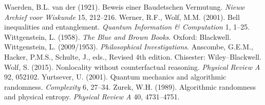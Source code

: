 \documentclass[12pt]{article}
\numberwithin{equation}{section}
\begin{document}
\begin{thebibliography}{99}
Waerden, B.L.  van der  (1921). Beweis einer Baudetschen
Vermutung. \emph{Nieuw Archief voor Wiskunde} 15, 212--216.
 \bibitem{}
 Werner, R.F., Wolf, M.M. (2001). Bell inequalities and entanglement. 
 \emph{Quantum Information \& Computation} 1, 1--25. 
 \bibitem{} Wittgenstein, L. (1958). \emph{The Blue and Brown Books}. Oxford:  Blackwell. 
 \bibitem{} Wittgenstein, L. (2009/1953). \emph{Philosophical Investigations}.  Anscombe, G.E.M., Hacker, P.M.S., Schulte, J., eds., Revised 4th edition. Chisester: Wiley--Blackwell. 
  \bibitem{} Wolf, S. (2015). Nonlocality without counterfactual reasoning. \emph{Physical Review A}  92, 052102.
 \bibitem{} Yurtsever, U. (2001). Quantum mechanics and algorithmic randomness. \emph{Complexity} 6, 27--34.
 \bibitem{}  Zurek, W.H. (1989). Algorithmic randomness and physical entropy. \emph{Physical Review A} 40, 4731--4751. 
\end{thebibliography}
\end{document}
